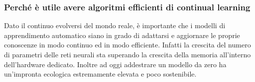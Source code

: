 \subsubsection*{Perché è utile avere algoritmi efficienti di continual learning}
Dato il continuo evolversi del mondo reale, è importante che i modelli di apprendimento automatico siano in grado di adattarsi e
aggiornare le proprie conoscenze in modo continuo ed in modo efficiente. Infatti la crescita del numero di parametri delle reti
neurali sta superando la crescita della memoria all'interno dell'hardware dedicato. Inoltre ad oggi addestrare un modello da zero
ha un'impronta ecologica estremamente elevata e poco sostenibile.
